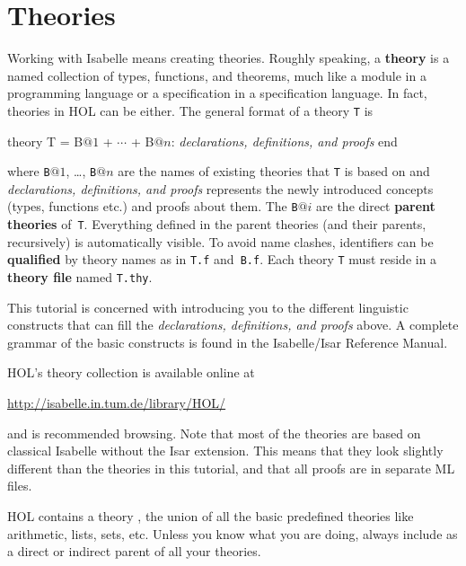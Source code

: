 \section{Theories}
\label{sec:Basic:Theories}

%
Working with Isabelle means creating theories. Roughly speaking, a
\textbf{theory} is a named collection of types, functions, and theorems,
much like a module in a programming language or a specification in a
specification language. In fact, theories in HOL can be either. The general
format of a theory \texttt{T} is
\begin{ttbox}
theory T = B\(@1\) + \(\cdots\) + B\(@n\):
{\rmfamily\textit{declarations, definitions, and proofs}}
end
\end{ttbox}
where \texttt{B}$@1$, \dots, \texttt{B}$@n$ are the names of existing
theories that \texttt{T} is based on and \textit{declarations,
    definitions, and proofs} represents the newly introduced concepts
(types, functions etc.) and proofs about them. The \texttt{B}$@i$ are the
direct \textbf{parent theories} of~\texttt{T}\@.
Everything defined in the parent theories (and their parents, recursively) is
automatically visible. To avoid name clashes, identifiers can be
\textbf{qualified}
by theory names as in \texttt{T.f} and~\texttt{B.f}. 
Each theory \texttt{T} must
reside in a \textbf{theory file} named \texttt{T.thy}.

This tutorial is concerned with introducing you to the different linguistic
constructs that can fill the \textit{declarations, definitions, and
    proofs} above.  A complete grammar of the basic
constructs is found in the Isabelle/Isar Reference Manual.

HOL's theory collection is available online at
\begin{center}\small
    \url{http://isabelle.in.tum.de/library/HOL/}
\end{center}
and is recommended browsing. Note that most of the theories 
are based on classical Isabelle without the Isar extension. This means that
they look slightly different than the theories in this tutorial, and that all
proofs are in separate ML files.

\begin{warn}
  HOL contains a theory , the union of all the basic
  predefined theories like arithmetic, lists, sets, etc.  
  Unless you know what you are doing, always include 
  as a direct or indirect parent of all your theories.
\end{warn}%


